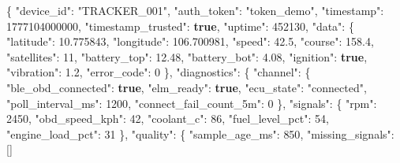 \documentclass[a4paper]{extarticle}
\newenvironment{Shaded}{}{}
\newcommand{\DataTypeTok}[1]{\textcolor[rgb]{0.56,0.13,0.00}{#1}}
\newcommand{\DecValTok}[1]{\textcolor[rgb]{0.25,0.63,0.44}{#1}}
\newcommand{\FloatTok}[1]{\textcolor[rgb]{0.25,0.63,0.44}{#1}}
\newcommand{\FunctionTok}[1]{\textcolor[rgb]{0.02,0.16,0.49}{#1}}
\newcommand{\KeywordTok}[1]{\textcolor[rgb]{0.00,0.44,0.13}{\textbf{#1}}}
\newcommand{\OtherTok}[1]{\textcolor[rgb]{0.00,0.44,0.13}{#1}}
\newcommand{\StringTok}[1]{\textcolor[rgb]{0.25,0.44,0.63}{#1}}
\begin{document}
\begin{Shaded}
\begin{Highlighting}[]
\FunctionTok{\{}
  \DataTypeTok{"device\_id"}\FunctionTok{:} \StringTok{"TRACKER\_001"}\FunctionTok{,}
  \DataTypeTok{"auth\_token"}\FunctionTok{:} \StringTok{"token\_demo"}\FunctionTok{,}
  \DataTypeTok{"timestamp"}\FunctionTok{:} \DecValTok{1777104000000}\FunctionTok{,}
  \DataTypeTok{"timestamp\_trusted"}\FunctionTok{:} \KeywordTok{true}\FunctionTok{,}
  \DataTypeTok{"uptime"}\FunctionTok{:} \DecValTok{452130}\FunctionTok{,}
  \DataTypeTok{"data"}\FunctionTok{:} \FunctionTok{\{}
    \DataTypeTok{"latitude"}\FunctionTok{:} \FloatTok{10.775843}\FunctionTok{,}
    \DataTypeTok{"longitude"}\FunctionTok{:} \FloatTok{106.700981}\FunctionTok{,}
    \DataTypeTok{"speed"}\FunctionTok{:} \FloatTok{42.5}\FunctionTok{,}
    \DataTypeTok{"course"}\FunctionTok{:} \FloatTok{158.4}\FunctionTok{,}
    \DataTypeTok{"satellites"}\FunctionTok{:} \DecValTok{11}\FunctionTok{,}
    \DataTypeTok{"battery\_top"}\FunctionTok{:} \FloatTok{12.48}\FunctionTok{,}
    \DataTypeTok{"battery\_bot"}\FunctionTok{:} \FloatTok{4.08}\FunctionTok{,}
    \DataTypeTok{"ignition"}\FunctionTok{:} \KeywordTok{true}\FunctionTok{,}
    \DataTypeTok{"vibration"}\FunctionTok{:} \FloatTok{1.2}\FunctionTok{,}
    \DataTypeTok{"error\_code"}\FunctionTok{:} \DecValTok{0}
  \FunctionTok{\},}
  \DataTypeTok{"diagnostics"}\FunctionTok{:} \FunctionTok{\{}
    \DataTypeTok{"channel"}\FunctionTok{:} \FunctionTok{\{}
      \DataTypeTok{"ble\_obd\_connected"}\FunctionTok{:} \KeywordTok{true}\FunctionTok{,}
      \DataTypeTok{"elm\_ready"}\FunctionTok{:} \KeywordTok{true}\FunctionTok{,}
      \DataTypeTok{"ecu\_state"}\FunctionTok{:} \StringTok{"connected"}\FunctionTok{,}
      \DataTypeTok{"poll\_interval\_ms"}\FunctionTok{:} \DecValTok{1200}\FunctionTok{,}
      \DataTypeTok{"connect\_fail\_count\_5m"}\FunctionTok{:} \DecValTok{0}
    \FunctionTok{\},}
    \DataTypeTok{"signals"}\FunctionTok{:} \FunctionTok{\{}
      \DataTypeTok{"rpm"}\FunctionTok{:} \DecValTok{2450}\FunctionTok{,}
      \DataTypeTok{"obd\_speed\_kph"}\FunctionTok{:} \DecValTok{42}\FunctionTok{,}
      \DataTypeTok{"coolant\_c"}\FunctionTok{:} \DecValTok{86}\FunctionTok{,}
      \DataTypeTok{"fuel\_level\_pct"}\FunctionTok{:} \DecValTok{54}\FunctionTok{,}
      \DataTypeTok{"engine\_load\_pct"}\FunctionTok{:} \DecValTok{31}
    \FunctionTok{\},}
    \DataTypeTok{"quality"}\FunctionTok{:} \FunctionTok{\{}
      \DataTypeTok{"sample\_age\_ms"}\FunctionTok{:} \DecValTok{850}\FunctionTok{,}
      \DataTypeTok{"missing\_signals"}\FunctionTok{:} \OtherTok{[]}

\end{Highlighting}
\end{Shaded}
\end{document}
